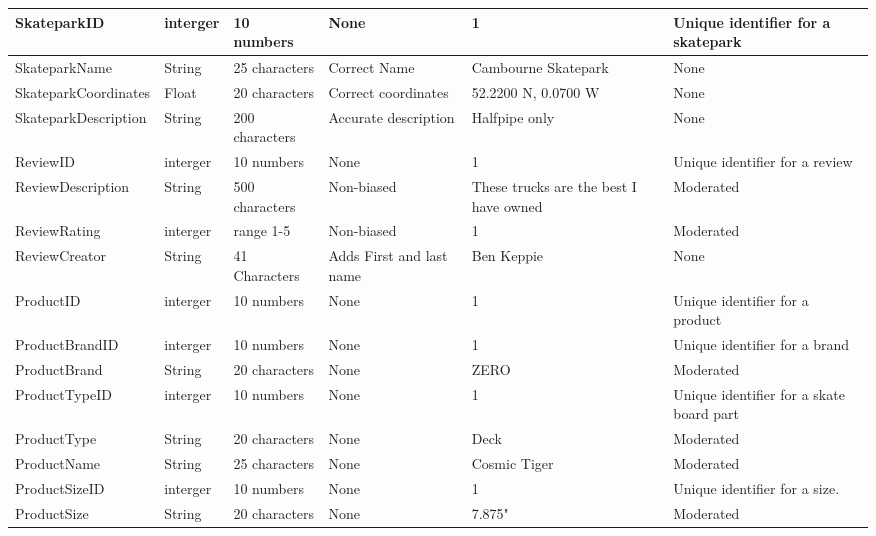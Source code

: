 \begin{landscape}
\begin{center}
\begin{tabular}{|p{3cm}|p{2cm}|p{2.5cm}|p{2cm}|p{3cm}|p{3cm}|}
\end{tabular}
\label{tab:Data Dictionary}
\end{center}

\begin{center}
\begin{tabular}{|p{3cm}|p{2cm}|p{2.5cm}|p{2cm}|p{3cm}|p{3cm}|}
    \hline
SkateparkID & interger & 10 numbers & None & 1 & Unique identifier for a skatepark \\ \hline
SkateparkName & String & 25 characters & Correct Name & Cambourne Skatepark & None  \\ \hline
SkateparkCoordinates  & Float & 20 characters & Correct coordinates & 52.2200 N, 0.0700 W & None  \\ \hline
SkateparkDescription & String & 200 characters & Accurate description & Halfpipe only & None \\ \hline

ReviewID & interger & 10 numbers & None & 1 & Unique identifier for a review \\ \hline 


ReviewDescription   & String & 500 characters & Non-biased & These trucks are the best I have owned & Moderated \\ \hline
ReviewRating & interger & range 1-5 & Non-biased & 1 & Moderated \\  \hline
ReviewCreator  & String & 41 Characters & Adds First and last name & Ben Keppie & None \\ \hline 

ProductID & interger & 10 numbers & None & 1 & Unique identifier for a product \\ \hline 
ProductBrandID & interger & 10 numbers & None & 1 & Unique identifier for a brand \\ \hline
ProductBrand & String & 20 characters & None & ZERO & Moderated \\ \hline
ProductTypeID & interger & 10 numbers & None & 1 & Unique identifier for a skate board part \\ \hline
ProductType & String & 20 characters & None & Deck & Moderated \\ \hline
ProductName & String & 25 characters & None & Cosmic Tiger & Moderated \\ \hline
ProductSizeID & interger & 10 numbers & None & 1 & Unique identifier for a size. \\ \hline
ProductSize & String & 20 characters & None & 7.875" & Moderated \\ \hline

\end{tabular}
\label{tab:Data Dictonary}
\end{center}

\end{landscape}



